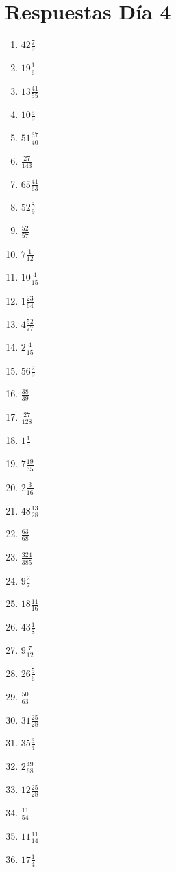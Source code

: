 \documentclass[12pt]{article}
\begin{document}
\section*{Respuestas Día 4}
\begin{enumerate}
\item $ 42 \frac{7}{9} $
\item $ 19 \frac{1}{6} $
\item $ 13 \frac{41}{55} $
\item $ 10 \frac{5}{9} $
\item $ 51 \frac{37}{40} $
\item $ \frac{27}{143} $
\item $ 65 \frac{41}{63} $
\item $ 52 \frac{8}{9} $
\item $ \frac{52}{57} $
\item $ 7 \frac{1}{12} $
\item $ 10 \frac{4}{15} $
\item $ 1 \frac{23}{64} $
\item $ 4 \frac{52}{77} $
\item $ 2 \frac{4}{15} $
\item $ 56 \frac{2}{9} $
\item $ \frac{38}{39} $
\item $ \frac{27}{128} $
\item $ 1 \frac{1}{5} $
\item $ 7 \frac{19}{35} $
\item $ 2 \frac{3}{16} $
\item $ 48 \frac{13}{28} $
\item $ \frac{63}{68} $
\item $ \frac{324}{385} $
\item $ 9 \frac{2}{7} $
\item $ 18 \frac{11}{16} $
\item $ 43 \frac{1}{8} $
\item $ 9 \frac{7}{12} $
\item $ 26 \frac{5}{6} $
\item $ \frac{50}{63} $
\item $ 31 \frac{25}{28} $
\item $ 35 \frac{3}{4} $
\item $ 2 \frac{49}{68} $
\item $ 12 \frac{25}{28} $
\item $ \frac{11}{54} $
\item $ 11 \frac{11}{14} $
\item $ 17 \frac{1}{4} $

\end{enumerate}
\end{document}
